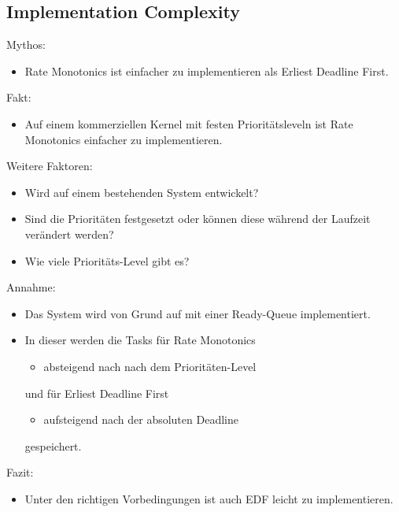 \subsection{Implementation Complexity}\label{ImplementationComplexity}
\begin{frame}{Mythos:}
	\begin{itemize}
		\item Rate Monotonics ist einfacher zu implementieren als Erliest Deadline First.
	\end{itemize}
\end{frame}

\begin{frame}{Fakt:}
	\begin{itemize}
		\item Auf einem kommerziellen Kernel mit festen Prioritätsleveln ist Rate Monotonics einfacher zu implementieren.
	\end{itemize}
\end{frame}
\begin{frame}{Weitere Faktoren:}
	\begin{itemize}
		\item Wird auf einem bestehenden System entwickelt?
		\item Sind die Prioritäten festgesetzt oder können diese während der Laufzeit verändert werden?
		\item Wie viele Prioritäts-Level gibt es?
	\end{itemize}
\end{frame}

\begin{frame}{Annahme:}
	\begin{itemize}
		\item Das System wird von Grund auf mit einer Ready-Queue implementiert.\pause
		\item In dieser werden die Tasks für Rate Monotonics
			\begin{itemize}
				\item absteigend nach nach dem Prioritäten-Level
			\end{itemize}
			und für Erliest Deadline First
			\begin{itemize}
				\item aufsteigend nach der absoluten Deadline
			\end{itemize} gespeichert.
	\end{itemize}
\end{frame}

\begin{frame}{Fazit:}
	\begin{itemize}
		\item Unter den richtigen Vorbedingungen ist auch EDF leicht zu implementieren.
	\end{itemize}
\end{frame}


